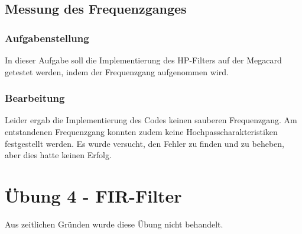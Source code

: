 \documentclass{article}
\begin{document}
\subsection{Messung des Frequenzganges}
\subsubsection{Aufgabenstellung}
In dieser Aufgabe soll die Implementierung des HP-Filters auf der Megacard getestet werden, indem der Frequenzgang aufgenommen wird.

\subsubsection{Bearbeitung}
Leider ergab die Implementierung des Codes keinen sauberen Frequenzgang. Am entstandenen Frequenzgang konnten zudem keine Hochpasscharakteristiken festgestellt werden. Es wurde versucht, den Fehler zu finden und zu beheben, aber dies hatte keinen Erfolg.

\section{Übung 4 - FIR-Filter}
Aus zeitlichen Gründen wurde diese Übung nicht behandelt.
\end{document}
